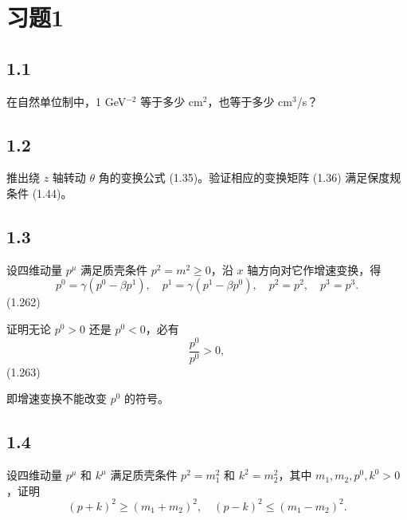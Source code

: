 \section{习题1}


\newpage
\subsection{1.1}
在自然单位制中，1 GeV$^{-2}$ 等于多少 cm$^2$，也等于多少 cm$^3$/s？

\newpage
\subsection{1.2}
推出绕 $z$ 轴转动 $\theta$ 角的变换公式 (1.35)。验证相应的变换矩阵 (1.36) 满足保度规条件 (1.44)。

\newpage
\subsection{1.3}
设四维动量 $p^\mu$ 满足质壳条件 $p^2 = m^2 \geq 0$，沿 $x$ 轴方向对它作增速变换，得
$$p^0 = \gamma (p^0 - \beta p^1), \quad p^1 = \gamma (p^1 - \beta p^0), \quad p^2 = p^2, \quad p^3 = p^3.$$
(1.262)

证明无论 $p^0 > 0$ 还是 $p^0 < 0$，必有
$$\frac{p^0}{p^0} > 0,$$
(1.263)

即增速变换不能改变 $p^0$ 的符号。

\newpage
\subsection{1.4}
设四维动量 $p^\mu$ 和 $k^\mu$ 满足质壳条件 $p^2 = m_1^2$ 和 $k^2 = m_2^2$，其中 $m_1, m_2, p^0, k^0 > 0$，证明
$$(p + k)^2 \geq (m_1 + m_2)^2, \quad (p - k)^2 \leq (m_1 - m_2)^2.$$

\newpage
